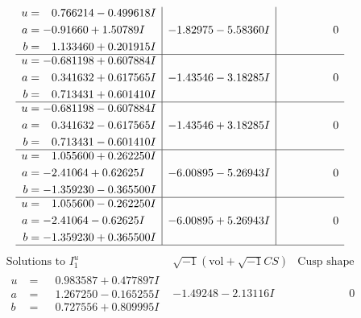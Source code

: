 \documentclass[1p]{elsarticle_modified}
\theoremstyle{definition}
\newcommand{\I}{\sqrt{-1}}
\begin{document}
$$\begin{array}{c|c|c}
\begin{aligned}
u &= \phantom{-}0.766214 - 0.499618 I \\
a &= -0.91660 + 1.50789 I \\
b &= \phantom{-}1.133460 + 0.201915 I\end{aligned}
 & -1.82975 - 5.58360 I & \phantom{-0.000000 } 0 \\ \hline\begin{aligned}
u &= -0.681198 + 0.607884 I \\
a &= \phantom{-}0.341632 + 0.617565 I \\
b &= \phantom{-}0.713431 + 0.601410 I\end{aligned}
 & -1.43546 - 3.18285 I & \phantom{-0.000000 } 0 \\ \hline\begin{aligned}
u &= -0.681198 - 0.607884 I \\
a &= \phantom{-}0.341632 - 0.617565 I \\
b &= \phantom{-}0.713431 - 0.601410 I\end{aligned}
 & -1.43546 + 3.18285 I & \phantom{-0.000000 } 0 \\ \hline\begin{aligned}
u &= \phantom{-}1.055600 + 0.262250 I \\
a &= -2.41064 + 0.62625 I \\
b &= -1.359230 - 0.365500 I\end{aligned}
 & -6.00895 - 5.26943 I & \phantom{-0.000000 } 0 \\ \hline\begin{aligned}
u &= \phantom{-}1.055600 - 0.262250 I \\
a &= -2.41064 - 0.62625 I \\
b &= -1.359230 + 0.365500 I\end{aligned}
 & -6.00895 + 5.26943 I & \phantom{-0.000000 } 0\\
 \hline 
 \end{array}$$\newpage$$\begin{array}{c|c|c}  
\text{Solutions to }I^u_{1}& \I (\text{vol} + \sqrt{-1}CS) & \text{Cusp shape}\\
 \hline 
\begin{aligned}
u &= \phantom{-}0.983587 + 0.477897 I \\
a &= \phantom{-}1.267250 - 0.165255 I \\
b &= \phantom{-}0.727556 + 0.809995 I\end{aligned}
 & -1.49248 - 2.13116 I & \phantom{-0.000000 } 0 \\ \hline\begin{aligned}

\end{aligned}
\end{array}$$
\end{document}
